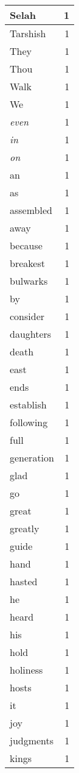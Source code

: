 \begin{center}
\begin{longtable}{l|r}
Selah & 1 \\ \hline
Tarshish & 1 \\ \hline
They & 1 \\ \hline
Thou & 1 \\ \hline
Walk & 1 \\ \hline
We & 1 \\ \hline
\emph{even} & 1 \\ \hline
\emph{in} & 1 \\ \hline
\emph{on} & 1 \\ \hline
an & 1 \\ \hline
as & 1 \\ \hline
assembled & 1 \\ \hline
away & 1 \\ \hline
because & 1 \\ \hline
breakest & 1 \\ \hline
bulwarks & 1 \\ \hline
by & 1 \\ \hline
consider & 1 \\ \hline
daughters & 1 \\ \hline
death & 1 \\ \hline
east & 1 \\ \hline
ends & 1 \\ \hline
establish & 1 \\ \hline
following & 1 \\ \hline
full & 1 \\ \hline
generation & 1 \\ \hline
glad & 1 \\ \hline
go & 1 \\ \hline
great & 1 \\ \hline
greatly & 1 \\ \hline
guide & 1 \\ \hline
hand & 1 \\ \hline
hasted & 1 \\ \hline
he & 1 \\ \hline
heard & 1 \\ \hline
his & 1 \\ \hline
hold & 1 \\ \hline
holiness & 1 \\ \hline
hosts & 1 \\ \hline
it & 1 \\ \hline
joy & 1 \\ \hline
judgments & 1 \\ \hline
kings & 1 \\ \hline

\end{longtable}
\end{center}
